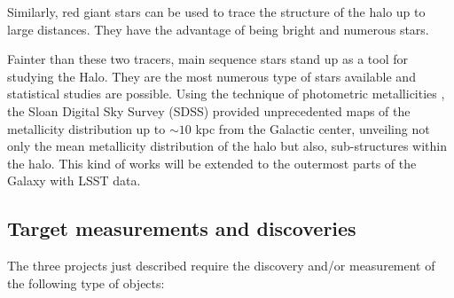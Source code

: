 Similarly, red giant stars can be used to trace the structure of the halo up to large
distances. They have the advantage 
of being bright and numerous stars.

Fainter than these two tracers, main sequence stars stand up as a tool for studying
the Halo. They are the most numerous type of stars available and statistical studies 
are possible. Using the technique of photometric metallicities \citep{ivezic08}, 
the Sloan Digital Sky Survey (SDSS) provided unprecedented maps of the metallicity distribution up to  $\sim 10$ 
kpc from the Galactic center, unveiling not only the mean metallicity distribution 
of the halo but also, sub-structures within the halo. This kind of works will be extended
to the outermost parts of the Galaxy with LSST data.



\subsection{Target measurements and discoveries}
\label{sec:\secname:MW_Halo_targets}

The three projects just described require the discovery and/or measurement of the following 
type of objects:

